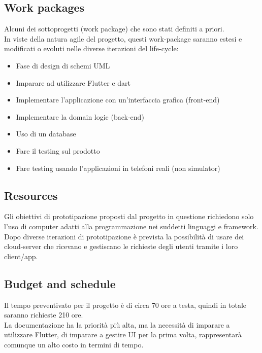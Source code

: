 \documentclass{article}
\begin{document}
\subsection{Work packages}
Alcuni dei sottoprogetti (work package) che sono stati definiti a priori.
\\ In viste della natura agile del progetto, questi work-package saranno estesi e modificati o evoluti nelle diverse iterazioni del life-cycle:
\begin{itemize}
    \item Fase di design di schemi UML
    \item Imparare ad utilizzare Flutter e dart
    \item Implementare l'applicazione con un'interfaccia grafica (front-end)
    \item Implementare la domain logic (back-end)
    \item Uso di un database
    \item Fare il testing sul prodotto
    \item Fare testing usando l'applicazioni in telefoni reali (non simulator)
\end{itemize}

\subsection{Resources}
Gli obiettivi di prototipazione proposti dal progetto in questione richiedono solo l'uso di computer adatti alla programmazione nei suddetti linguaggi e framework.
Dopo diverse iterazioni di prototipazione è prevista la possibilità di usare dei cloud-server che ricevano e gestiscano le richieste degli utenti tramite i loro client/app. 

\subsection{Budget and schedule}
Il tempo preventivato per il progetto è di circa 70 ore a testa, quindi in totale saranno richieste 210 ore.
\\La documentazione ha la priorità più alta, ma la necessità di imparare a utilizzare Flutter, di imparare a gestire UI per la prima volta, rappresentarà comunque un alto costo in termini di tempo.
\end{document}
